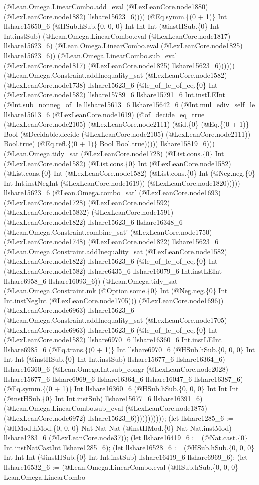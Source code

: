 \documentclass[11pt]{article}
\begin{document}
(@Lean.Omega.LinearCombo.add\_eval (@LexLeanCore.node1880) (@LexLeanCore.node1882) llshare15623\_6)))) (@Eq.symm.\{(0 + 1)\} Int llshare15650\_6 (@HSub.hSub.\{0, 0, 0\} Int Int Int (@instHSub.\{0\} Int Int.instSub) (@Lean.Omega.LinearCombo.eval (@LexLeanCore.node1817) llshare15623\_6) (@Lean.Omega.LinearCombo.eval (@LexLeanCore.node1825) llshare15623\_6)) (@Lean.Omega.LinearCombo.sub\_eval (@LexLeanCore.node1817) (@LexLeanCore.node1825) llshare15623\_6)))))) (@Lean.Omega.Constraint.addInequality\_sat (@LexLeanCore.node1582) (@LexLeanCore.node1738) llshare15623\_6 (@le\_of\_le\_of\_eq.\{0\} Int (@LexLeanCore.node1582) llshare15789\_6 llshare15791\_6 Int.instLEInt (@Int.sub\_nonneg\_of\_le llshare15613\_6 llshare15642\_6 (@Int.mul\_ediv\_self\_le llshare15613\_6 (@LexLeanCore.node1619) (@of\_decide\_eq\_true (@LexLeanCore.node2105) (@LexLeanCore.node2111) (@id.\{0\} (@Eq.\{(0 + 1)\} Bool (@Decidable.decide (@LexLeanCore.node2105) (@LexLeanCore.node2111)) Bool.true) (@Eq.refl.\{(0 + 1)\} Bool Bool.true))))) llshare15819\_6))) (@Lean.Omega.tidy\_sat (@LexLeanCore.node1728) (@List.cons.\{0\} Int (@LexLeanCore.node1582) (@List.cons.\{0\} Int (@LexLeanCore.node1582) (@List.cons.\{0\} Int (@LexLeanCore.node1582) (@List.cons.\{0\} Int (@Neg.neg.\{0\} Int Int.instNegInt (@LexLeanCore.node1619)) (@LexLeanCore.node1820))))) llshare15623\_6 (@Lean.Omega.combo\_sat' (@LexLeanCore.node1693) (@LexLeanCore.node1728) (@LexLeanCore.node1592) (@LexLeanCore.node15832) (@LexLeanCore.node1591) (@LexLeanCore.node1822) llshare15623\_6 llshare16348\_6 (@Lean.Omega.Constraint.combine\_sat' (@LexLeanCore.node1750) (@LexLeanCore.node1748) (@LexLeanCore.node1822) llshare15623\_6 (@Lean.Omega.Constraint.addInequality\_sat (@LexLeanCore.node1582) (@LexLeanCore.node1822) llshare15623\_6 (@le\_of\_le\_of\_eq.\{0\} Int (@LexLeanCore.node1582) llshare6435\_6 llshare16079\_6 Int.instLEInt llshare6958\_6 llshare16093\_6)) (@Lean.Omega.tidy\_sat (@Lean.Omega.Constraint.mk (@Option.some.\{0\} Int (@Neg.neg.\{0\} Int Int.instNegInt (@LexLeanCore.node1705))) (@LexLeanCore.node1696)) (@LexLeanCore.node6963) llshare15623\_6 (@Lean.Omega.Constraint.addInequality\_sat (@LexLeanCore.node1705) (@LexLeanCore.node6963) llshare15623\_6 (@le\_of\_le\_of\_eq.\{0\} Int (@LexLeanCore.node1582) llshare6970\_6 llshare16360\_6 Int.instLEInt llshare6985\_6 (@Eq.trans.\{(0 + 1)\} Int llshare6970\_6 (@HSub.hSub.\{0, 0, 0\} Int Int Int (@instHSub.\{0\} Int Int.instSub) llshare15677\_6 llshare16364\_6) llshare16360\_6 (@Lean.Omega.Int.sub\_congr (@LexLeanCore.node2028) llshare15677\_6 llshare6969\_6 llshare16364\_6 llshare16047\_6 llshare16387\_6) (@Eq.symm.\{(0 + 1)\} Int llshare16360\_6 (@HSub.hSub.\{0, 0, 0\} Int Int Int (@instHSub.\{0\} Int Int.instSub) llshare15677\_6 llshare16391\_6) (@Lean.Omega.LinearCombo.sub\_eval (@LexLeanCore.node1875) (@LexLeanCore.node6972) llshare15623\_6))))))))))); (let llshare1285\_6 := (@HMod.hMod.\{0, 0, 0\} Nat Nat Nat (@instHMod.\{0\} Nat Nat.instMod) llshare1283\_6 (@LexLeanCore.node37)); (let llshare16419\_6 := (@Nat.cast.\{0\} Int instNatCastInt llshare1285\_6); (let llshare16528\_6 := (@HSub.hSub.\{0, 0, 0\} Int Int Int (@instHSub.\{0\} Int Int.instSub) llshare16419\_6 llshare6969\_6); (let llshare16532\_6 := (@Lean.Omega.LinearCombo.eval (@HSub.hSub.\{0, 0, 0\} Lean.Omega.LinearCombo 
\end{document}
